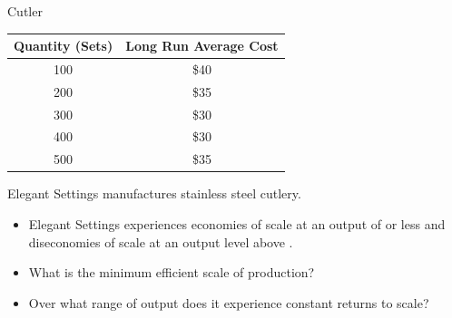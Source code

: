 \documentclass{beamer}
\begin{document}
\begin{frame}{Cutler}
    \begin{table}[]
    \begin{tabular}{cc}
    Quantity (Sets) & Long Run Average Cost \\ \hline
    100             & \$40                  \\ \hline
    200             & \$35                  \\ \hline
    300             & \$30                  \\ \hline
    400             & \$30                  \\ \hline
    500             & \$35                 
    \end{tabular}
    \end{table}
    Elegant Settings manufactures stainless steel cutlery.
    \begin{itemize}
        \item Elegant Settings experiences economies of scale at an output of \underline{\phantom{3000}} or less and diseconomies of scale at an output level above \underline{\phantom{4000}}.
        \item What is the minimum efficient scale of production?
        \item Over what range of output does it experience constant returns to scale?
    \end{itemize}
\end{frame}
\end{document}
